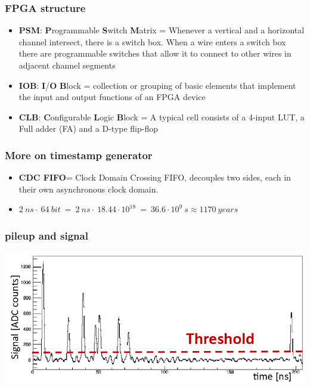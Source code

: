 \documentclass[aspectratio=169]{beamer}
\begin{document}
	\begin{frame}
		\frametitle{FPGA structure}
		\begin{itemize}
			\item \textbf{PSM}: \textbf{P}rogrammable \textbf{S}witch \textbf{M}atrix = Whenever a vertical and a horizontal channel intersect, there is a switch box. When a wire enters a switch box there are programmable switches that allow it to connect to other wires in adjacent channel segments
			\item \textbf{IOB}: \textbf{I}/\textbf{O} \textbf{B}lock = collection or grouping of basic elements that implement the input and output functions of an FPGA device
			\item \textbf{CLB}: \textbf{C}onfigurable \textbf{L}ogic \textbf{B}lock = A typical cell consists of a 4-input LUT, a Full adder (FA) and a D-type flip-flop
		\end{itemize}
	\end{frame}

	\begin{frame}
		\frametitle{More on timestamp generator}
		\begin{center}
			\begin{itemize}
				\item \textbf{CDC FIFO}= Clock Domain Crossing FIFO, decouples two sides, each in their own asynchronous clock domain.
				\item $2 \: ns \cdot \: 64 \: bit \: =\: 2 \: ns \cdot \: 18.44\cdot10^{18} \: = \: 36.6\cdot10^{9} \: s \approx 1170 \: years$
			\end{itemize}
		\end{center}
	\end{frame}

	\begin{frame}
		\frametitle{pileup and signal}
		\begin{center}
			\includegraphics[width=0.95 \textwidth]{IMG2/PILEUP}
		\end{center}
	\end{frame}
\end{document}
